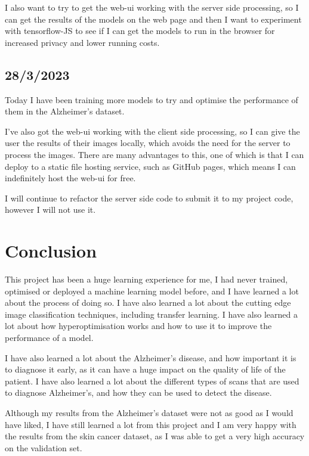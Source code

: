 \documentclass[]{final_report}
\begin{document}
I also want to try to get the web-ui working with the server side processing, so I can get the results of the models on the web page and then I want to experiment with tensorflow-JS to see if I can get the models to run in the browser for increased privacy and lower running costs.

\section*{28/3/2023}

Today I have been training more models to try and optimise the performance of them in the Alzheimer's dataset.

I've also got the web-ui working with the client side processing, so I can give the user the results of their images locally, which avoids the need for the server to process the images. There are many advantages to this, one of which is that I can deploy to a static file hosting service, such as GitHub pages, which means I can indefinitely host the web-ui for free.

I will continue to refactor the server side code to submit it to my project code, however I will not use it.

\chapter{Conclusion}

This project has been a huge learning experience for me, I had never trained, optimised or deployed a machine learning model before, and I have learned a lot about the process of doing so. I have also learned a lot about the cutting edge image classification techniques, including transfer learning. I have also learned a lot about how hyperoptimisation works and how to use it to improve the performance of a model.

I have also learned a lot about the Alzheimer's disease, and how important it is to diagnose it early, as it can have a huge impact on the quality of life of the patient. I have also learned a lot about the different types of scans that are used to diagnose Alzheimer's, and how they can be used to detect the disease. 

Although my results from the Alzheimer's dataset were not as good as I would have liked, I have still learned a lot from this project and I am very happy with the results from the skin cancer dataset, as I was able to get a very high accuracy on the validation set.
\end{document}
